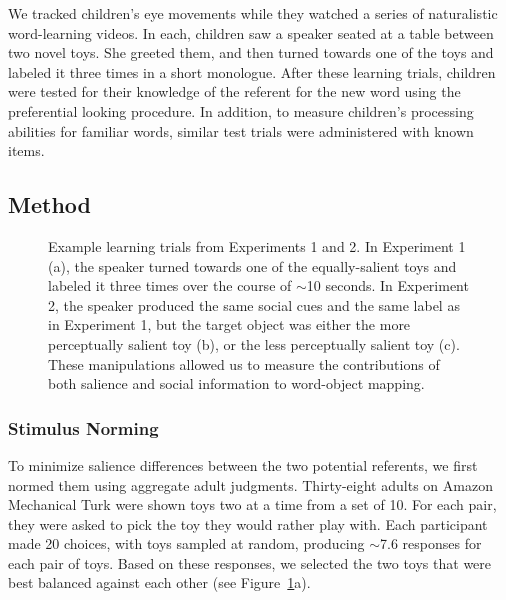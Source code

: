 \documentclass[man,floatsintext]{apa6}
\begin{document}
We tracked children's eye movements while they watched a series of naturalistic word-learning videos. In each, children saw a speaker seated at a table between two novel toys. She greeted them, and then turned towards one of the toys and labeled it three times in a short monologue. After these learning trials, children were tested for their knowledge of the referent for the new word using the preferential looking procedure. In addition, to measure children's processing abilities for familiar words, similar test trials were administered with known items.

\subsection{Method}

\begin{figure}[tb]
	\caption{\label{fig:design} Example learning trials from Experiments 1 and 2. In Experiment 1 (a), the speaker turned towards one of the equally-salient toys and labeled it three times over the course of $\sim$10 seconds. In Experiment 2, the speaker produced the same social cues and the same label as in Experiment 1, but the target object was either the more perceptually salient toy (b), or the less perceptually salient toy (c). These manipulations allowed us to measure the contributions of both salience and social information to word-object mapping.}
\end{figure}

\subsubsection{Stimulus Norming}
To minimize salience differences between the two potential referents, we first normed them using aggregate adult judgments. Thirty-eight adults on Amazon Mechanical Turk were shown toys two at a time from a set of 10. For each pair, they were asked to pick the toy they would rather play with. Each participant made 20 choices, with toys sampled at random, producing $\sim$7.6 responses for each pair of toys. Based on these responses, we selected the two toys that were best balanced against each other (see Figure~\ref{fig:design}a).
\end{document}
